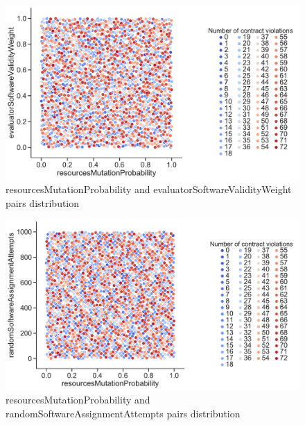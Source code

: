 \begin{figure}
	\centering
	\includegraphics[width=\textwidth]{images/PairsDistr/resourcesMutationProbability_evaluatorSoftwareValidityWeight.pdf}
	\caption[resourcesMutationProbability and evaluatorSoftwareValidityWeight pairs distribution]{resourcesMutationProbability and evaluatorSoftwareValidityWeight pairs distribution}
	\label{fig:resourcesMutationProbability_evaluatorSoftwareValidityWeight_pair}
\end{figure}
\clearpage
\begin{figure}
	\centering
	\includegraphics[width=\textwidth]{images/PairsDistr/resourcesMutationProbability_randomSoftwareAssignmentAttempts.pdf}
	\caption[resourcesMutationProbability and randomSoftwareAssignmentAttempts pairs distribution]{resourcesMutationProbability and randomSoftwareAssignmentAttempts pairs distribution}
	\label{fig:resourcesMutationProbability_randomSoftwareAssignmentAttempts_pair}
\end{figure}
\clearpage
